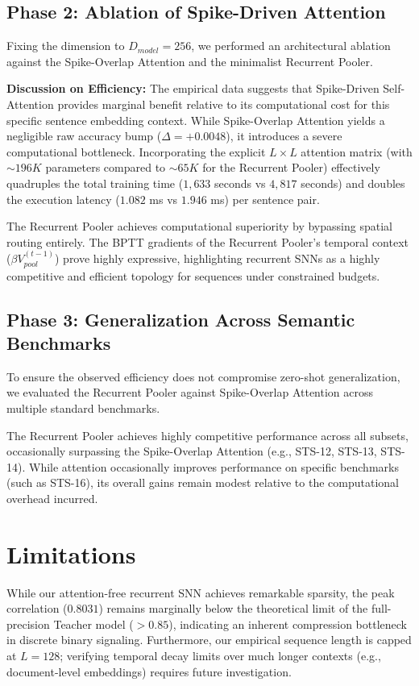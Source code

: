 \documentclass{article} %
\begin{document}
\subsection{Phase 2: Ablation of Spike-Driven Attention}
Fixing the dimension to $D_{model} = 256$, we performed an architectural ablation against the Spike-Overlap Attention and the minimalist Recurrent Pooler.



\textbf{Discussion on Efficiency:} The empirical data suggests that Spike-Driven Self-Attention provides marginal benefit relative to its computational cost for this specific sentence embedding context. While Spike-Overlap Attention yields a negligible raw accuracy bump ($\Delta = +0.0048$), it introduces a severe computational bottleneck. Incorporating the explicit $L \times L$ attention matrix (with $\sim 196K$ parameters compared to $\sim 65K$ for the Recurrent Pooler) effectively quadruples the total training time ($1,633$ seconds vs $4,817$ seconds) and doubles the execution latency ($1.082$ ms vs $1.946$ ms) per sentence pair. 

The Recurrent Pooler achieves computational superiority by bypassing spatial routing entirely. The BPTT gradients of the Recurrent Pooler's temporal context ($ \beta V_{pool}^{(t-1)} $) prove highly expressive, highlighting recurrent SNNs as a highly competitive and efficient topology for sequences under constrained budgets.

\subsection{Phase 3: Generalization Across Semantic Benchmarks}
To ensure the observed efficiency does not compromise zero-shot generalization, we evaluated the Recurrent Pooler against Spike-Overlap Attention across multiple standard benchmarks.



The Recurrent Pooler achieves highly competitive performance across all subsets, occasionally surpassing the Spike-Overlap Attention (e.g., STS-12, STS-13, STS-14). While attention occasionally improves performance on specific benchmarks (such as STS-16), its overall gains remain modest relative to the computational overhead incurred.

\section{Limitations}
While our attention-free recurrent SNN achieves remarkable sparsity, the peak correlation ($0.8031$) remains marginally below the theoretical limit of the full-precision Teacher model ($>0.85$), indicating an inherent compression bottleneck in discrete binary signaling. Furthermore, our empirical sequence length is capped at $L=128$; verifying temporal decay limits over much longer contexts (e.g., document-level embeddings) requires future investigation.
\end{document}
